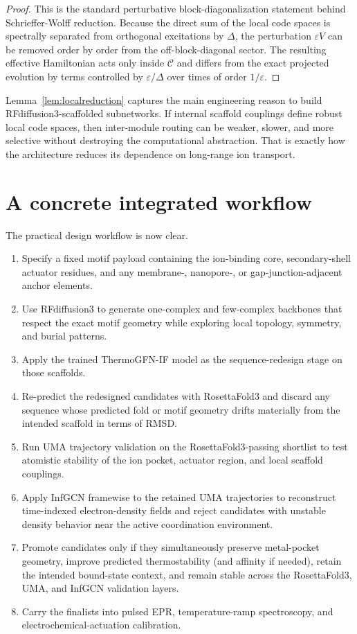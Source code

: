 \documentclass[11pt]{report}
\newcommand{\Code}{\mathcal{C}}
\theoremstyle{definition}
\begin{document}
\begin{proof}
This is the standard perturbative block-diagonalization statement behind Schrieffer-Wolff reduction. Because the direct sum of the local code spaces is spectrally separated from orthogonal excitations by $\Delta$, the perturbation $\varepsilon V$ can be removed order by order from the off-block-diagonal sector. The resulting effective Hamiltonian acts only inside $\Code$ and differs from the exact projected evolution by terms controlled by $\varepsilon/\Delta$ over times of order $1/\varepsilon$.
\end{proof}

Lemma~\ref{lem:localreduction} captures the main engineering reason to build RFdiffusion3-scaffolded subnetworks. If internal scaffold couplings define robust local code spaces, then inter-module routing can be weaker, slower, and more selective without destroying the computational abstraction. That is exactly how the architecture reduces its dependence on long-range ion transport.

\section{A concrete integrated workflow}
The practical design workflow is now clear.

\begin{enumerate}[leftmargin=2em]
\item Specify a fixed motif payload containing the ion-binding core, secondary-shell actuator residues, and any membrane-, nanopore-, or gap-junction-adjacent anchor elements.
\item Use RFdiffusion3 to generate one-complex and few-complex backbones that respect the exact motif geometry while exploring local topology, symmetry, and burial patterns.
\item Apply the trained ThermoGFN-IF model as the sequence-redesign stage on those scaffolds.
\item Re-predict the redesigned candidates with RosettaFold3 and discard any sequence whose predicted fold or motif geometry drifts materially from the intended scaffold in terms of RMSD.
\item Run UMA trajectory validation on the RosettaFold3-passing shortlist to test atomistic stability of the ion pocket, actuator region, and local scaffold couplings.
\item Apply InfGCN framewise to the retained UMA trajectories to reconstruct time-indexed electron-density fields and reject candidates with unstable density behavior near the active coordination environment.
\item Promote candidates only if they simultaneously preserve metal-pocket geometry, improve predicted thermostability (and affinity if needed), retain the intended bound-state context, and remain stable across the RosettaFold3, UMA, and InfGCN validation layers.
\item Carry the finalists into pulsed EPR, temperature-ramp spectroscopy, and electrochemical-actuation calibration.
\end{enumerate}
\end{document}
